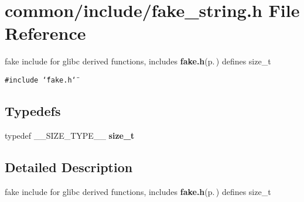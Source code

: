 \section{common/include/fake\_\-string.h File Reference}
\label{fake__string_8h}
fake include for glibc derived functions, includes {\bf fake.h}{\rm (p.\,\pageref{fake_8h})} defines size\_\-t 

{\tt \#include \char`\"{}fake.h\char`\"{}}\par
\subsection*{Typedefs}
\begin{CompactItemize}
\item 
typedef \_\-\_\-SIZE\_\-TYPE\_\-\_\- {\bf size\_\-t}\label{fake__string_8h_a0}

\end{CompactItemize}


\subsection{Detailed Description}
fake include for glibc derived functions, includes {\bf fake.h}{\rm (p.\,\pageref{fake_8h})} defines size\_\-t 

